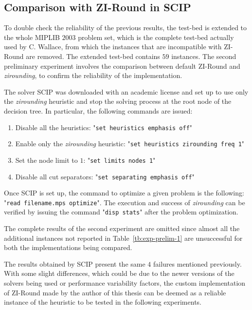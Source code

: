 \documentclass[a4paper,12pt,twoside]{scrbook}
\begin{document}
\subsection{Comparison with ZI-Round in SCIP}
To double check the reliability of the previous results, the test-bed is extended to the whole MIPLIB $2003$ problem set, which is the complete test-bed actually used by C. Wallace, from which the instances that are incompatible with ZI-Round are removed. The extended test-bed contains $59$ instances. The second preliminary experiment involves the comparison between default ZI-Round and \textit{zirounding}, to confirm the reliability of the implementation. \par 

The solver SCIP was downloaded with an academic license and set up to use only the \textit{zirounding} heuristic and stop the solving process at the root node of the decision tree. In particular, the following commands are issued:
\begin{enumerate}
	\item Disable all the heuristics: "\texttt{set heuristics emphasis off}"
	\item Enable only the \textit{zirounding} heuristic: "\texttt{set heuristics zirounding freq 1}"
	\item Set the node limit to $1$: "\texttt{set limits nodes 1}"
	\item Disable all cut separators: "\texttt{set separating emphasis off}"
\end{enumerate}
Once SCIP is set up, the command to optimize a given problem is the following: "\texttt{read filename.mps optimize}". The execution and success of \textit{zirounding} can be verified by issuing the command "\texttt{disp stats}" after the problem optimization. \par

The complete results of the second experiment are omitted since almost all the additional instances not reported in Table~\ref{tb:exp-prelim-1} are unsuccessful for both the implementations being compared.  \par 

The results obtained by SCIP present the same $4$ failures mentioned previously. With some slight differences, which could be due to the newer versions of the solvers being used or performance variability factors, the custom implementation of ZI-Round made by the author of this thesis can be deemed as a reliable instance of the heuristic to be tested in the following experiments.
\end{document}
